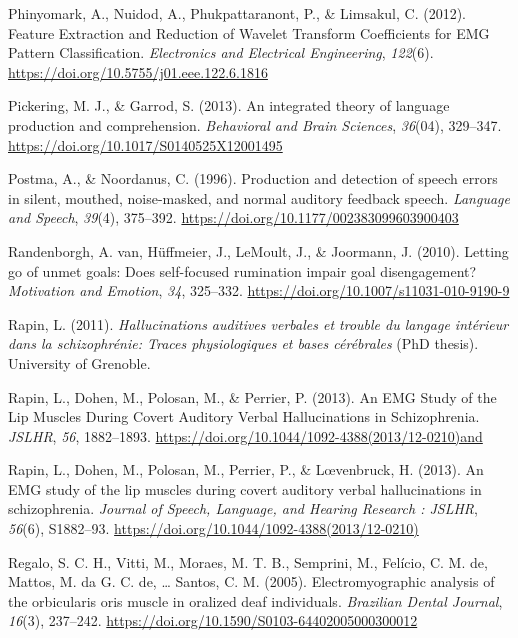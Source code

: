 \documentclass[a4paper,12pt,twoside,openright,oldfontcommands]{memoir}
\begin{document}
\hypertarget{ref-phinyomark_feature_2012}{}
Phinyomark, A., Nuidod, A., Phukpattaranont, P., \& Limsakul, C. (2012).
Feature Extraction and Reduction of Wavelet Transform Coefficients for
EMG Pattern Classification. \emph{Electronics and Electrical
Engineering}, \emph{122}(6).
\url{https://doi.org/10.5755/j01.eee.122.6.1816}

\hypertarget{ref-pickering_integrated_2013}{}
Pickering, M. J., \& Garrod, S. (2013). An integrated theory of language
production and comprehension. \emph{Behavioral and Brain Sciences},
\emph{36}(04), 329--347. \url{https://doi.org/10.1017/S0140525X12001495}

\hypertarget{ref-postma_production_1996}{}
Postma, A., \& Noordanus, C. (1996). Production and detection of speech
errors in silent, mouthed, noise-masked, and normal auditory feedback
speech. \emph{Language and Speech}, \emph{39}(4), 375--392.
\url{https://doi.org/10.1177/002383099603900403}

\hypertarget{ref-VanRandenborgh2010}{}
Randenborgh, A. van, Hüffmeier, J., LeMoult, J., \& Joormann, J. (2010).
Letting go of unmet goals: Does self-focused rumination impair goal
disengagement? \emph{Motivation and Emotion}, \emph{34}, 325--332.
\url{https://doi.org/10.1007/s11031-010-9190-9}

\hypertarget{ref-Rapin2011}{}
Rapin, L. (2011). \emph{Hallucinations auditives verbales et trouble du
langage intérieur dans la schizophrénie: Traces physiologiques et bases
cérébrales} (PhD thesis). University of Grenoble.

\hypertarget{ref-rapin_emg_2013}{}
Rapin, L., Dohen, M., Polosan, M., \& Perrier, P. (2013). An EMG Study
of the Lip Muscles During Covert Auditory Verbal Hallucinations in
Schizophrenia. \emph{JSLHR}, \emph{56}, 1882--1893.
\url{https://doi.org/10.1044/1092-4388(2013/12-0210)and}

\hypertarget{ref-Rapin2013}{}
Rapin, L., Dohen, M., Polosan, M., Perrier, P., \& Lœvenbruck, H.
(2013). An EMG study of the lip muscles during covert auditory verbal
hallucinations in schizophrenia. \emph{Journal of Speech, Language, and
Hearing Research : JSLHR}, \emph{56}(6), S1882--93.
\url{https://doi.org/10.1044/1092-4388(2013/12-0210)}

\hypertarget{ref-regalo_electromyographic_2005}{}
Regalo, S. C. H., Vitti, M., Moraes, M. T. B., Semprini, M., Felício, C.
M. de, Mattos, M. da G. C. de, \ldots{} Santos, C. M. (2005).
Electromyographic analysis of the orbicularis oris muscle in oralized
deaf individuals. \emph{Brazilian Dental Journal}, \emph{16}(3),
237--242. \url{https://doi.org/10.1590/S0103-64402005000300012}
\end{document}
